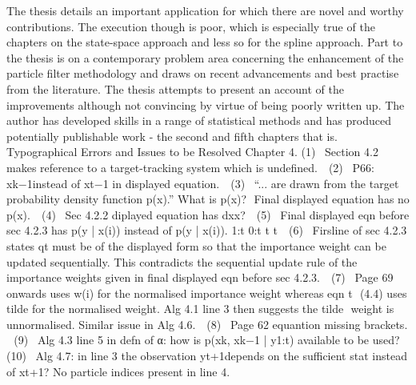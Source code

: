 \documentclass[a4paper,18pt]{extarticle}
\begin{document}
The thesis details an important application for which there are novel and worthy contributions. The execution though is poor, which is especially true of the chapters on the state-space approach and less so for the spline approach. Part to the thesis is on a contemporary problem area concerning the enhancement of the particle filter methodology and draws on recent advancements and best practise from the literature. The thesis attempts to present an account of the improvements although not convincing by virtue of being poorly written up. The author has developed skills in a range of statistical methods and has produced potentially publishable work - the second and fifth chapters that is. 
Typographical Errors and Issues to be Resolved 
Chapter 4. 
(1)  Section 4.2 makes reference to a target-tracking system which is undefined.  
(2)  P66: xk−1instead of xt−1 in displayed equation.  
(3)  “... are drawn from the target probability density function p(x).” What is p(x)?  Final displayed equation has no p(x).  
(4)  Sec 4.2.2 diplayed equation has dxx?  
(5)  Final displayed eqn before sec 4.2.3 has p(y | x(i)) instead of p(y | x(i)). 1:t 0:t t t  
(6)  Firsline of sec 4.2.3 states qt must be of the displayed form so that the importance weight can be updated sequentially. This contradicts the sequential update rule of the importance weights given in final displayed eqn before sec 4.2.3.  
(7)  Page 69 onwards uses w(i) for the normalised importance weight whereas eqn t  (4.4) uses tilde for the normalised weight. Alg 4.1 line 3 then suggests the tilde  weight is unnormalised. Similar issue in Alg 4.6.  
(8)  Page 62 equantion missing brackets.  
(9)  Alg 4.3 line 5 in defn of α: how is p(xk, xk−1 | y1:t) available to be used?  
(10)  Alg 4.7: in line 3 the observation yt+1depends on the sufficient stat instead of xt+1? No particle indices present in line 4.  
\end{document}

